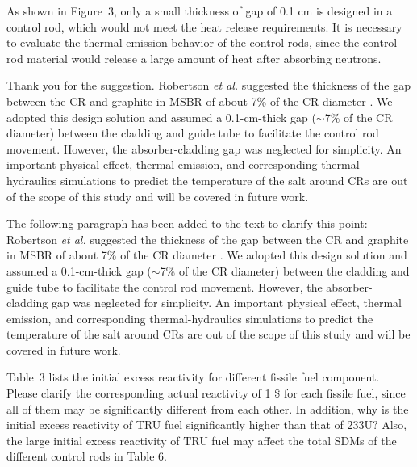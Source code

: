 \documentclass[answers,11pt]{exam}
\begin{document}
\begin{questions}
\begin{solution}
     
\end{solution}

\question As shown in Figure~3, only a small thickness of gap of 0.1 cm is designed in a control rod, which would not meet the heat release requirements. It is necessary to evaluate the thermal emission behavior of the control rods, since the control rod material would release a large amount of heat after absorbing neutrons.
\begin{solution}
	
    Thank you for the suggestion. Robertson \emph{et al.} suggested the thickness of the gap between the CR and graphite in MSBR of about 7\% of the CR diameter \cite{robertson_conceptual_1971}. We adopted this design solution and assumed a 0.1-cm-thick gap ($\sim$7\% of the CR diameter) between the cladding and guide tube to facilitate the control rod movement. However, the absorber-cladding gap was neglected for simplicity. An important physical effect, thermal emission, and corresponding thermal-hydraulics simulations to predict the temperature of the salt around CRs are out of the scope of this study and will be covered in future work.
	
	The following paragraph has been added to the text to clarify this point:\\
	
	Robertson \emph{et al.} suggested the thickness of the gap between the CR and graphite in MSBR of about 7\% of the CR diameter \cite{robertson_conceptual_1971}. We adopted this design solution and assumed a 0.1-cm-thick gap ($\sim$7\% of the CR diameter) between the cladding and guide tube to facilitate the control rod movement. However, the absorber-cladding gap was neglected for simplicity. An important physical effect, thermal emission, and corresponding thermal-hydraulics simulations to predict the temperature of the salt around CRs are out of the scope of this study and will be covered in future work.
	
	
\end{solution}

\question Table~3 lists the initial excess reactivity for different fissile fuel component. Please clarify the corresponding actual reactivity of 1 \$ for each fissile fuel, since all of them may be significantly different from each other. In addition, why is the initial excess reactivity of TRU fuel significantly higher than that of 233U? Also, the large initial excess reactivity of TRU fuel may affect the total SDMs of the different control rods in Table 6.
\begin{solution}
	

\end{solution}
\end{questions}
\end{document}
